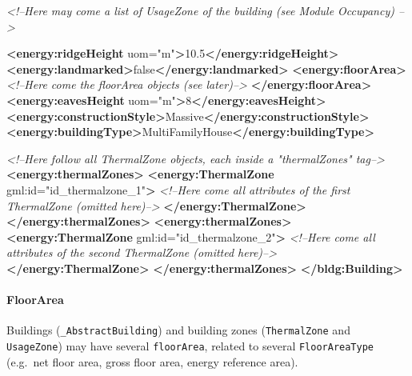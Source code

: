 \documentclass[a4paper,12pt]{article}
\newenvironment{Shaded}{}{}
\newcommand{\KeywordTok}[1]{\textcolor[rgb]{0.00,0.44,0.13}{\textbf{{#1}}}}
\newcommand{\StringTok}[1]{\textcolor[rgb]{0.25,0.44,0.63}{{#1}}}
\newcommand{\CommentTok}[1]{\textcolor[rgb]{0.38,0.63,0.69}{\textit{{#1}}}}
\newcommand{\OtherTok}[1]{\textcolor[rgb]{0.00,0.44,0.13}{{#1}}}
\newcommand{\NormalTok}[1]{{#1}}
\begin{document}
\begin{Shaded}
\begin{Highlighting}[]
    \CommentTok{<!--Here may come a list of UsageZone of the building (see Module Occupancy) -->}

    \KeywordTok{<energy:ridgeHeight}\OtherTok{ uom=}\StringTok{"m"}\KeywordTok{>}\NormalTok{10.5}\KeywordTok{</energy:ridgeHeight>}
    \KeywordTok{<energy:landmarked>}\NormalTok{false}\KeywordTok{</energy:landmarked>}
    \KeywordTok{<energy:floorArea>}
        \CommentTok{<!--Here come the floorArea objects (see later)-->}
    \KeywordTok{</energy:floorArea>}
    \KeywordTok{<energy:eavesHeight}\OtherTok{ uom=}\StringTok{"m"}\KeywordTok{>}\NormalTok{8}\KeywordTok{</energy:eavesHeight>}
    \KeywordTok{<energy:constructionStyle>}\NormalTok{Massive}\KeywordTok{</energy:constructionStyle>}
    \KeywordTok{<energy:buildingType>}\NormalTok{MultiFamilyHouse}\KeywordTok{</energy:buildingType>}

    \CommentTok{<!--Here follow all ThermalZone objects, each inside a "thermalZones" tag-->}
    \KeywordTok{<energy:thermalZones>}
        \KeywordTok{<energy:ThermalZone}\OtherTok{ gml:id=}\StringTok{"id_thermalzone_1"}\KeywordTok{>}
            \CommentTok{<!--Here come all attributes of the first ThermalZone (omitted here)-->}
        \KeywordTok{</energy:ThermalZone>}
    \KeywordTok{</energy:thermalZones>}
    \KeywordTok{<energy:thermalZones>}
        \KeywordTok{<energy:ThermalZone}\OtherTok{ gml:id=}\StringTok{"id_thermalzone_2"}\KeywordTok{>}
            \CommentTok{<!--Here come all attributes of the second ThermalZone (omitted here)-->}
        \KeywordTok{</energy:ThermalZone>}
    \KeywordTok{</energy:thermalZones>}
\KeywordTok{</bldg:Building>}
\end{Highlighting}
\end{Shaded}

\paragraph{FloorArea}\label{floorarea}

Buildings (\texttt{\_AbstractBuilding}) and building zones
(\texttt{ThermalZone} and \texttt{UsageZone}) may have several
\texttt{floorArea}, related to several \texttt{FloorAreaType} (e.g.~net
floor area, gross floor area, energy reference area).
\end{document}
